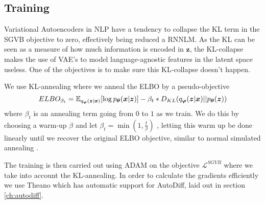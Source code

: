 \subsection{Training}
Variational Autoencoders in NLP have a tendency to collapse the KL term in the
SGVB objective to zero, effectively being reduced a RNNLM. As the KL can be seen
as a measure of how much information is encoded in $\bm{z}$, the KL-collapse makes the
use of VAE's to model language-agnostic features in the latent space useless.
One of the objectives is to make sure this KL-collapse doesn't happen.

We use KL-annealing where we anneal the ELBO by a pseudo-objective
\begin{equation}
  \label{eq:KL_annealing_ELBO}
  ELBO_{\beta_t} = \operatorname{\mathbb{E}}_{q_{\bm{\varphi}}(\bm{z} | \bm{x})}[\log p_{\bm{\theta}}(\bm{x} | \bm{z})] - \beta_t * D_{KL}(q_{\bm{\varphi}}(\bm{z} | \bm{x}) || p_{\bm{\theta}}(\bm{z}))
\end{equation}
where $\beta_t$ is an annealing term going from $0$ to $1$ as we train. We do
this by choosing a warm-up $\beta$ and let $\beta_t = \min(1, \frac{t}{\beta})$ \cite{bowman_generating_2015},
letting this warm up be done linearly until we recover the original ELBO
objective, similar to normal simulated annealing \cite{Kirkpatrick1983}.

The training is then carried out using ADAM on the objective
$\mathcal{L}^{SGVB}$ where we take into account the KL-annealing. In order to
calculate the gradients efficiently we use Theano which has automatic support
for AutoDiff, laid out in section \ref{ch:autodiff}.